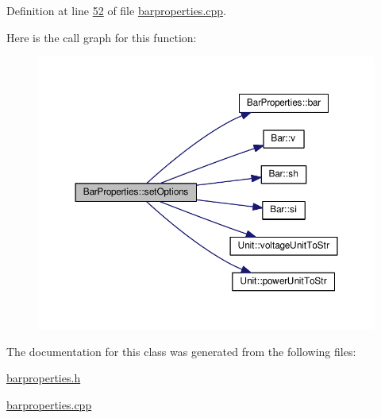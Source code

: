 Definition at line \hyperlink{barproperties_8cpp_source_l00052}{52} of file \hyperlink{barproperties_8cpp_source}{barproperties.\+cpp}.



Here is the call graph for this function\+:\nopagebreak
\begin{figure}[H]
\begin{center}
\leavevmode
\includegraphics[width=350pt]{class_bar_properties_a80cba99404820272603c4da8fb708c05_cgraph}
\end{center}
\end{figure}




The documentation for this class was generated from the following files\+:\begin{DoxyCompactItemize}
\item 
\hyperlink{barproperties_8h}{barproperties.\+h}\item 
\hyperlink{barproperties_8cpp}{barproperties.\+cpp}\end{DoxyCompactItemize}
